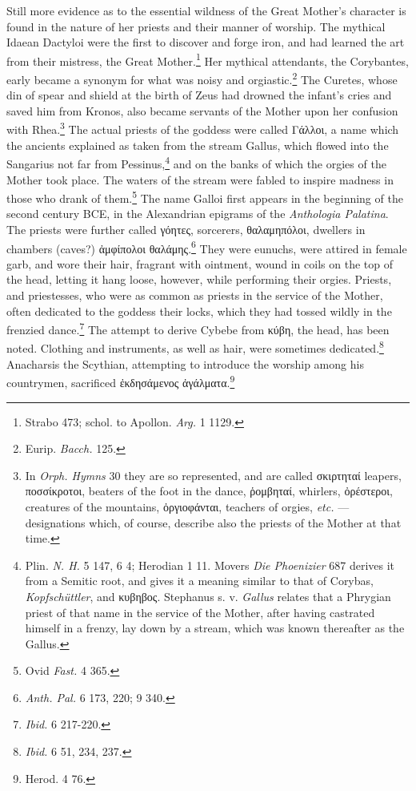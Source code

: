 \documentclass[a4paper, 11pt, oneside, polutonikogreek, english]{article}
\begin{document}
Still more evidence as to the essential wildness of the Great Mother's character is found in the nature of her priests and their manner of worship. The mythical Idaean Dactyloi were the first to discover and forge iron, and had learned the art from their mistress, the Great Mother.\footnote{Strabo 473; schol. to Apollon. \emph{Arg.} 1 1129.} Her mythical attendants, the Corybantes, early became a synonym for what was noisy and orgiastic.\footnote{Eurip. \emph{Bacch.} 125.} The Curetes, whose din of spear and shield at the birth of Zeus had drowned the infant's cries and saved him from Kronos, also became servants of the Mother upon her confusion with Rhea.\footnote{In \emph{Orph. Hymns} 30 they are so represented, and are called σκιρτηταί leapers, ποσσίκροτοι, beaters of the foot in the dance, ῥομβηταί, whirlers, ὀρέστεροι, creatures of the mountains, ὀργιοφάνται, teachers of orgies, \emph{etc.} --- designations which, of course, describe also the priests of the Mother at that time.} The actual priests of the goddess were called Γάλλοι, a name which the ancients explained as taken from the stream Gallus, which flowed into the Sangarius not far from Pessinus,\footnote{Plin. \emph{N. H.} 5 147, 6 4; Herodian 1 11. Movers \emph{Die Phoenizier} 687 derives it from a Semitic root, and gives it a meaning similar to that of Corybas, \emph{Kopfschüttler}, and κυβηβος. Stephanus s. v. \emph{Gallus} relates that a Phrygian priest of that name in the service of the Mother, after having castrated himself in a frenzy, lay down by a stream, which was known thereafter as the Gallus.} and on the banks of which the orgies of the Mother took place. The waters of the stream were fabled to inspire madness in those who drank of them.\footnote{Ovid \emph{Fast.} 4 365.} The name Galloi first appears in the beginning of the second century \textsc{BCE}, in the Alexandrian epigrams of the \emph{Anthologia Palatina}. The priests were further called γόητες, sorcerers, θαλαμηπόλοι, dwellers in chambers (caves?) ἀμφίπολοι θαλάμης.\footnote{\emph{Anth. Pal.} 6 173, 220; 9 340.} They were eunuchs, were attired in female garb, and wore their hair, fragrant with ointment, wound in coils on the top of the head, letting it hang loose, however, while performing their orgies. Priests, and priestesses, who were as common as priests in the service of the Mother, often dedicated to the goddess their locks, which they had tossed wildly in the frenzied dance.\footnote{\emph{Ibid.} 6 217-220.} The attempt to derive Cybebe from κύβη, the head, has been noted. Clothing and instruments, as well as hair, were sometimes dedicated.\footnote{\emph{Ibid.} 6 51, 234, 237.} Anacharsis the Scythian, attempting to introduce the worship among his countrymen, sacrificed ἐκδησάμενος ἀγάλματα.\footnote{Herod. 4 76.}
\end{document}

